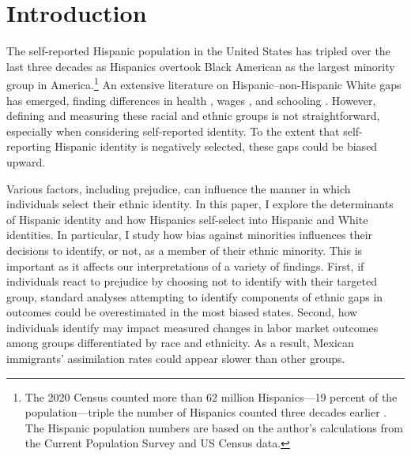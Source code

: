 \documentclass[12pt,english]{article}
\begin{document}

\section{Introduction}\label{sec:intro}

The self-reported Hispanic population in the United States has tripled over the last three decades as Hispanics overtook Black American as the largest minority group in America.\footnote{The 2020 Census counted more than 62 million Hispanics---19 percent of the population---triple the number of Hispanics counted three decades earlier \autocite{floodsarahIntegratedPublicUse2021a}. The Hispanic population numbers are based on the author's calculations from the Current Population Survey and US Census data.} An extensive literature on Hispanic--non-Hispanic White gaps has emerged, finding differences in health \autocite{antecolUnhealthyAssimilationWhy2006,antmanEthnicAttritionObserved2016}, wages \autocite{trejoWhyMexicanAmericans1997}, and schooling \autocite{antmanHispanicAmericansLabor2022}. However, defining and measuring these racial and ethnic groups is not straightforward, especially when considering self-reported identity. To the extent that self-reporting Hispanic identity is negatively selected, these gaps could be biased upward.

Various factors, including prejudice, can influence the manner in which individuals select their ethnic identity. In this paper, I explore the determinants of Hispanic identity and how Hispanics self-select into Hispanic and White identities. In particular, I study how bias against minorities influences their decisions to identify, or not, as a member of their ethnic minority. This is important as it affects our interpretations of a variety of findings. First, if individuals react to prejudice by choosing not to identify with their targeted group, standard analyses attempting to identify components of ethnic gaps in outcomes could be overestimated in the most biased states. Second, how individuals identify may impact measured changes in labor market outcomes among groups differentiated by race and ethnicity. As a result, Mexican immigrants' assimilation rates could appear slower than other groups. 
\end{document}
